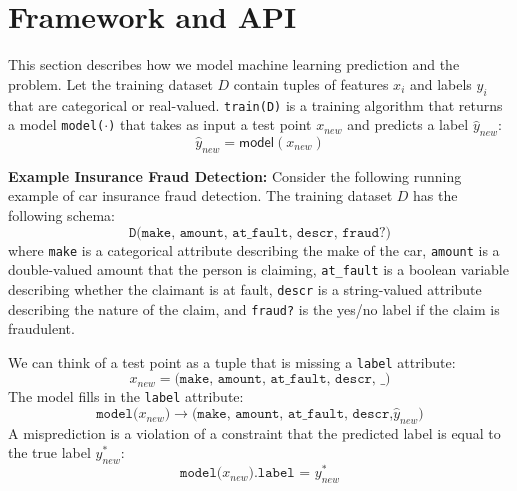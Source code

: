 \section{Framework and API}
This section describes how we model machine learning prediction and the \sys problem.
Let the training dataset $D$ contain tuples of features $x_i$ and labels $y_i$ that are categorical or real-valued.
\texttt{train(D)} is a training algorithm that returns a model \texttt{model($\cdot$)} that takes as input a test point $x_{new}$ and predicts a label $\hat{y}_{new}$:
\[
\hat{y}_{new} = \textsf{model}(x_{new})
\]

\vspace{0.5em}\noindent \textbf{Example Insurance Fraud Detection: } Consider the following running example of car insurance fraud detection. The training dataset $D$ has the following schema:
\[
\texttt{D(make, amount, at\_fault, descr, fraud?)}
\]
where \texttt{make} is a categorical attribute describing the make of the car, \texttt{amount} is a double-valued amount that the person is claiming, \texttt{at\_fault} is a boolean variable describing whether the claimant is at fault, \texttt{descr} is a string-valued attribute describing the nature of the claim, and \texttt{fraud?} is the yes/no label if the claim is fraudulent.

We can think of a test point as a tuple that is missing a \texttt{label} attribute: 
$$x_{new} = \texttt{(make, amount, at\_fault, descr, \_)}$$
The model fills in the \texttt{label} attribute:
\[
  \texttt{model(}x_{new}\texttt{)} \rightarrow \texttt{(make, amount, at\_fault, descr,} \hat{y}_{new} )
\]
A misprediction is a violation of a constraint that the predicted label is equal to the true label $y^*_{new}$:
\[
  \texttt{model(}x_{new}\texttt{).label = } y^*_{new}
\]

